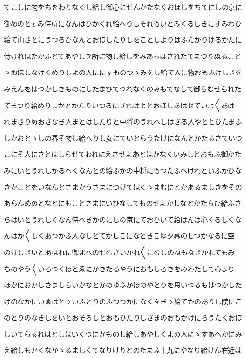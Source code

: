 \documentclass[a4paper,11pt,landscape]{ltjtarticle}
\begin{document}
てこしに物をちをわりなくし給し御心にせんかたなくおほしをちてにしの京に
\par\medskip
御めのとすみ侍所になんはひかくれ給へりしそれもいとみくるしきにすみわひ
\par\medskip
給て山さとにうつろひなんとおほしたりしをことしよりはふたかりけるかたに
\par\medskip
侍けれはたかふとてあやしき所に物し給しをみあらはされたてまつりぬること
\par\medskip
ゝおほしなけくめりしよの人ににすものつゝみをし給て人に物おもふけしきを
\par\medskip
みえんをはつかしきものにしたまひてつれなくのみもてなして御らむせられた
\par\medskip
てまつり給めりしかとかたりいつるにされはよとおほしあはせていよ〱あは
\par\medskip
れまさりぬおさなき人まとはしたりと中将のうれへしはさる人やととひたまふ
\par\medskip
しかおとゝしの春そ物し給へりし女にていとらうたけになんとかたるさていつ
\par\medskip
こにそ人にさとはしらせてわれにえさせよあとはかなくいみしとおもふ御かた
\par\medskip
みにいとうれしかるへくなんとの給ふかの中将にもつたふへけれといふかひな
\par\medskip
きかことをいなんとさまかうさまにつけてはくゝまむにとかあるましきをその
\par\medskip
あらんめのとなとにもことさまにいひなしてものせよかしなとかたらひ給ふさ
\par\medskip
らはいとうれしくなん侍へきかのにしの京にておひいて給はんは心くるしくな
\par\medskip
んはか〱しくあつかふ人なしとてかしこになときこゆ夕暮のしつかなるに空
\par\medskip
のけしきいとあはれに御まへのせむさいかれ〱にむしのねもなきかれてもみ
\par\medskip
ちのやう〱いろつくほとゑにかきたるやうにおもしろきをみわたして心より
\par\medskip
ほかにおかしきましらいかなとかのゆふかほのやとりを思いつるもはつかした
\par\medskip
けのなかにいゑはとゝいふとりのふつつかになくをきゝ給てかのありし院にこ
\par\medskip
のとりのなきしをいとおそろしとおもひたりしさまのおもかけにらうたくおほ
\par\medskip
しいてらるれはとしはいくつにかものし給しあやしくよの人にゝすあへかにみ
\par\medskip
え給しもかくなかゝるましくてなりけりとのたまふ十九にやなり給けん右近は
\end{document}

